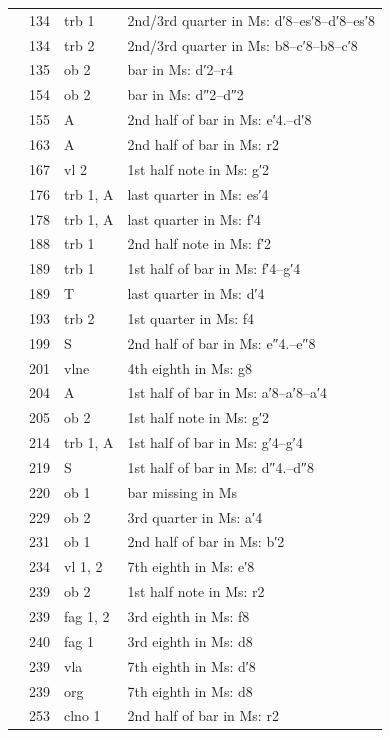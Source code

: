 \documentclass[parskip=full]{scrreprt}
\begin{document}
\begin{longtable}{lll L{10cm}}
	  & 134 & trb 1    & 2nd/3rd quarter in Ms: d′8–es′8–d′8–es′8 \\
	  & 134 & trb 2    & 2nd/3rd quarter in Ms: b8–c′8–b8–c′8 \\
	  & 135 & ob 2     & bar in Ms: d′2–r4 \\
	  & 154 & ob 2     & bar in Ms: d″2–d″2 \\
	  & 155 & A        & 2nd half of bar in Ms: e′4.–d′8 \\
	  & 163 & A        & 2nd half of bar in Ms: r2 \\
	  & 167 & vl 2     & 1st half note in Ms: g′2 \\
	  & 176 & trb 1, A & last quarter in Ms: es′4 \\
	  & 178 & trb 1, A & last quarter in Ms: f′4 \\
	  & 188 & trb 1    & 2nd half note in Ms: f′2 \\
	  & 189 & trb 1    & 1st half of bar in Ms: f′4–g′4 \\
	  & 189 & T        & last quarter in Ms: d′4 \\
	  & 193 & trb 2    & 1st quarter in Ms: f4 \\
	  & 199 & S        & 2nd half of bar in Ms: e″4.–e″8 \\
	  & 201 & vlne     & 4th eighth in Ms: g8 \\
	  & 204 & A        & 1st half of bar in Ms: a′8–a′8–a′4 \\
	  & 205 & ob 2     & 1st half note in Ms: g′2 \\
	  & 214 & trb 1, A & 1st half of bar in Ms: g′4–g′4 \\
	  & 219 & S        & 1st half of bar in Ms: d″4.–d″8 \\
	  & 220 & ob 1     & bar missing in Ms \\
	  & 229 & ob 2     & 3rd quarter in Ms: a′4 \\
	  & 231 & ob 1     & 2nd half of bar in Ms: b′2 \\
	  & 234 & vl 1, 2  & 7th eighth in Ms: e′8 \\
	  & 239 & ob 2     & 1st half note in Ms: r2 \\
	  & 239 & fag 1, 2 & 3rd eighth in Ms: f8 \\
	  & 240 & fag 1    & 3rd eighth in Ms: d8 \\
	  & 239 & vla      & 7th eighth in Ms: d′8 \\
	  & 239 & org      & 7th eighth in Ms: d8 \\
	  & 253 & clno 1   & 2nd half of bar in Ms: r2 \\

\end{longtable}
\end{document}
